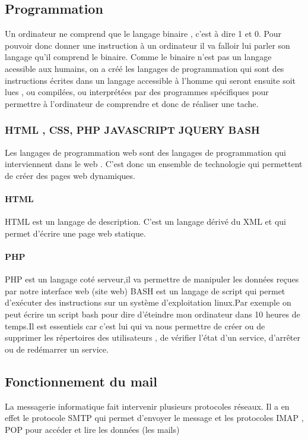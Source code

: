 \documentclass[a4paper,12pt,french]{report} %
\begin{document}
\subsection{Programmation}
Un ordinateur ne comprend que le langage binaire , c'est à dire  1 et 0. Pour pouvoir donc donner une instruction à un ordinateur il va falloir lui parler son langage qu'il comprend le binaire. Comme le binaire n'est pas un langage acessible aux humains, on a créé les langages de programmation qui sont des instructions écrites dans un langage accessible à l'homme qui seront ensuite soit lues , ou compilées, ou  interprétées par des programmes spécifiques pour permettre à l'ordinateur de comprendre et donc de réaliser une tache.
\subsubsection{HTML , CSS, PHP JAVASCRIPT JQUERY BASH}
Les langages de programmation  web sont des langages de programmation qui interviennent dans le web . C'est donc un ensemble de technologie qui permettent de créer des pages web dynamiques.
\paragraph{HTML} 
HTML est un langage de description. C'est un langage dérivé du XML et qui permet d'écrire une page web statique. 
\paragraph{PHP}
PHP est un langage coté serveur,il va permettre de manipuler les données reçues par notre interface web (site web)
BASH est un langage de script qui permet d'exécuter des instructions sur un système d'exploitation linux.Par exemple on peut écrire un script bash pour dire d'éteindre mon ordinateur dans 10 heures de temps.Il est essentiels car c'est lui qui va nous permettre de créer ou de supprimer les répertoires des utilisateurs , de vérifier l'état d'un service, d'arrêter ou de redémarrer un service.

\subsection{Fonctionnement du mail}
La messagerie informatique fait intervenir plusieurs protocoles réseaux. Il a en effet le protocole SMTP qui permet d'envoyer le message et les protocoles IMAP , POP pour accéder et lire les données  (les mails)
\end{document}
